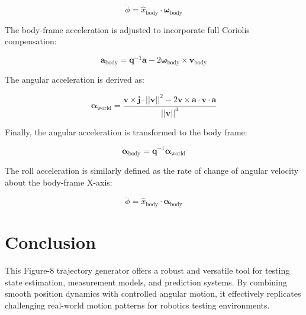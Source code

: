 \documentclass{article}
\begin{document}
	\[
	\dot{\phi} = \hat{x}_{\text{body}} \cdot \boldsymbol{\omega}_{\text{body}}
	\]

	The body-frame acceleration is adjusted to incorporate full Coriolis compensation:

	\[
	\mathbf{a}_{\text{body}} = \mathbf{q}^{-1} \mathbf{a} - 2 \boldsymbol{\omega}_{\text{body}} \times \mathbf{v}_{\text{body}}
	\]

	The angular acceleration is derived as:

	\[
	\boldsymbol{\alpha}_{\text{world}} = \frac{\mathbf{v} \times \mathbf{j} \cdot ||\mathbf{v}||^2 - 2\mathbf{v} \times \mathbf{a} \cdot \mathbf{v} \cdot \mathbf{a}}{||\mathbf{v}||^4}
	\]

	Finally, the angular acceleration is transformed to the body frame:

	\[
	\boldsymbol{\alpha}_{\text{body}} = \mathbf{q}^{-1} \boldsymbol{\alpha}_{\text{world}}
	\]

	The roll acceleration is similarly defined as the rate of change of angular velocity about the body-frame X-axis:

	\[
	\ddot{\phi} = \hat{x}_{\text{body}} \cdot \boldsymbol{\alpha}_{\text{body}}
	\]

	\section{Conclusion}
	This Figure-8 trajectory generator offers a robust and versatile tool for testing state estimation, measurement models, and prediction systems. By combining smooth position dynamics with controlled angular motion, it effectively replicates challenging real-world motion patterns for robotics testing environments.
\end{document}
